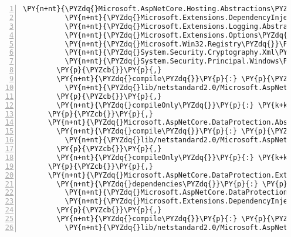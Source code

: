 \begin{Verbatim}[commandchars=\\\{\},numbers=left,firstnumber=1,stepnumber=1,numberblanklines=0]
          \PY{n+nt}{\PYZdq{}Microsoft.AspNetCore.Hosting.Abstractions\PYZdq{}}\PY{p}{:} \PY{l+s+s2}{\PYZdq{}2.1.0\PYZhy{}rc1\PYZhy{}final\PYZdq{}}\PY{p}{,}
          \PY{n+nt}{\PYZdq{}Microsoft.Extensions.DependencyInjection.Abstractions\PYZdq{}}\PY{p}{:} \PY{l+s+s2}{\PYZdq{}2.1.0\PYZhy{}rc1\PYZhy{}final\PYZdq{}}\PY{p}{,}
          \PY{n+nt}{\PYZdq{}Microsoft.Extensions.Logging.Abstractions\PYZdq{}}\PY{p}{:} \PY{l+s+s2}{\PYZdq{}2.1.0\PYZhy{}rc1\PYZhy{}final\PYZdq{}}\PY{p}{,}
          \PY{n+nt}{\PYZdq{}Microsoft.Extensions.Options\PYZdq{}}\PY{p}{:} \PY{l+s+s2}{\PYZdq{}2.1.0\PYZhy{}rc1\PYZhy{}final\PYZdq{}}\PY{p}{,}
          \PY{n+nt}{\PYZdq{}Microsoft.Win32.Registry\PYZdq{}}\PY{p}{:} \PY{l+s+s2}{\PYZdq{}4.5.0\PYZhy{}rc1\PYZdq{}}\PY{p}{,}
          \PY{n+nt}{\PYZdq{}System.Security.Cryptography.Xml\PYZdq{}}\PY{p}{:} \PY{l+s+s2}{\PYZdq{}4.5.0\PYZhy{}rc1\PYZdq{}}\PY{p}{,}
          \PY{n+nt}{\PYZdq{}System.Security.Principal.Windows\PYZdq{}}\PY{p}{:} \PY{l+s+s2}{\PYZdq{}4.5.0\PYZhy{}rc1\PYZdq{}}
        \PY{p}{\PYZcb{}}\PY{p}{,}
        \PY{n+nt}{\PYZdq{}compile\PYZdq{}}\PY{p}{:} \PY{p}{\PYZob{}}
          \PY{n+nt}{\PYZdq{}lib/netstandard2.0/Microsoft.AspNetCore.DataProtection.dll\PYZdq{}}\PY{p}{:} \PY{p}{\PYZob{}}\PY{p}{\PYZcb{}}
        \PY{p}{\PYZcb{}}\PY{p}{,}
        \PY{n+nt}{\PYZdq{}compileOnly\PYZdq{}}\PY{p}{:} \PY{k+kc}{true}
      \PY{p}{\PYZcb{}}\PY{p}{,}
      \PY{n+nt}{\PYZdq{}Microsoft.AspNetCore.DataProtection.Abstractions/2.1.0\PYZhy{}rc1\PYZhy{}final\PYZdq{}}\PY{p}{:} \PY{p}{\PYZob{}}
        \PY{n+nt}{\PYZdq{}compile\PYZdq{}}\PY{p}{:} \PY{p}{\PYZob{}}
          \PY{n+nt}{\PYZdq{}lib/netstandard2.0/Microsoft.AspNetCore.DataProtection.Abstractions.dll\PYZdq{}}\PY{p}{:} \PY{p}{\PYZob{}}\PY{p}{\PYZcb{}}
        \PY{p}{\PYZcb{}}\PY{p}{,}
        \PY{n+nt}{\PYZdq{}compileOnly\PYZdq{}}\PY{p}{:} \PY{k+kc}{true}
      \PY{p}{\PYZcb{}}\PY{p}{,}
      \PY{n+nt}{\PYZdq{}Microsoft.AspNetCore.DataProtection.Extensions/2.1.0\PYZhy{}rc1\PYZhy{}final\PYZdq{}}\PY{p}{:} \PY{p}{\PYZob{}}
        \PY{n+nt}{\PYZdq{}dependencies\PYZdq{}}\PY{p}{:} \PY{p}{\PYZob{}}
          \PY{n+nt}{\PYZdq{}Microsoft.AspNetCore.DataProtection\PYZdq{}}\PY{p}{:} \PY{l+s+s2}{\PYZdq{}2.1.0\PYZhy{}rc1\PYZhy{}final\PYZdq{}}\PY{p}{,}
          \PY{n+nt}{\PYZdq{}Microsoft.Extensions.DependencyInjection\PYZdq{}}\PY{p}{:} \PY{l+s+s2}{\PYZdq{}2.1.0\PYZhy{}rc1\PYZhy{}final\PYZdq{}}
        \PY{p}{\PYZcb{}}\PY{p}{,}
        \PY{n+nt}{\PYZdq{}compile\PYZdq{}}\PY{p}{:} \PY{p}{\PYZob{}}
          \PY{n+nt}{\PYZdq{}lib/netstandard2.0/Microsoft.AspNetCore.DataProtection.Extensions.dll\PYZdq{}}\PY{p}{:} \PY{p}{\PYZob{}}\PY{p}{\PYZcb{}}

\end{Verbatim}
